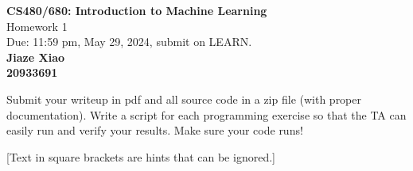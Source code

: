 \documentclass[10pt]{article}
\newcommand{\red}[1]{{\color{red}#1}}
\newcommand{\green}[1]{{\color{green}#1}}
\begin{document}
\begin{center}
  \large{\textbf{CS480/680: Introduction to Machine Learning} \\ Homework 1\\ \red{Due: 11:59 pm, May 29, 2024}, \red{submit on LEARN}.} \\

  {\bf \green{Jiaze Xiao}} \\
  {\bf \green{20933691}}

\end{center}

\begin{center}
  Submit your writeup in pdf and all source code in a zip file (with proper documentation). Write a script for each programming exercise so that the TA can easily run and verify your results. Make sure your code runs!

  [Text in square brackets are hints that can be ignored.]
\end{center}
\end{document}
